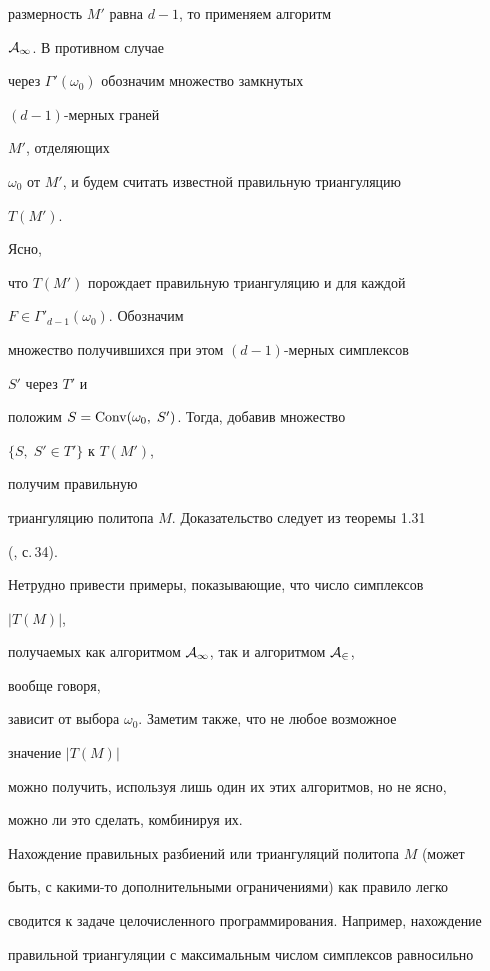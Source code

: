 размерность $M'$ равна $d-1$, то применяем алгоритм


$\cal A_1$. В противном случае


через $\Gamma'(\omega_0)$ обозначим множество замкнутых


$(d-1)$-мерных граней


$M'$, отделяющих


$\omega_0$ от $M'$, и будем считать известной правильную триангуляцию


$T(M')$.


Ясно,


что $T(M')$ порождает правильную триангуляцию и для каждой


$F\in\Gamma'_{d-1}(\omega_0)$. Обозначим


множество получившихся при этом $(d-1)$-мерных симплексов


$S'$ через $T'$ и


положим $S=\operatorname{Conv}(\omega_0,\;S')$. Тогда, добавив множество


$\{S,\;S'\in T'\}$ к $T(M')$,


получим правильную


триангуляцию политопа $M$. Доказательство следует из теоремы 1.31


(\cite{S1}, с.\,34).





Нетрудно привести примеры, показывающие, что число симплексов


$|T(M)|$,


получаемых как алгоритмом $\cal A_1$, так и алгоритмом $\cal A_2$,


вообще говоря,


зависит от выбора $\omega_0$. Заметим также, что не любое возможное


значение $|T(M)|$


можно получить, используя лишь один их этих алгоритмов, но не ясно,


можно ли это сделать, комбинируя их.





Нахождение правильных разбиений или триангуляций политопа $M$ (может


быть, с какими-то дополнительными ограничениями) как правило легко


сводится к задаче целочисленного программирования. Например, нахождение


правильной триангуляции с максимальным числом симплексов равносильно


